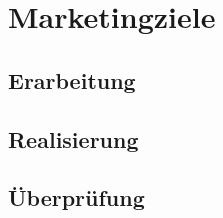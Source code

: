 \section{Marketingziele}
\label{sec:mziele}

\subsection{Erarbeitung}

\subsection{Realisierung}

\subsection{Überprüfung}
